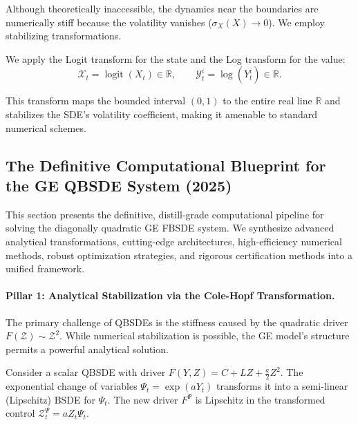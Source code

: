 Although theoretically inaccessible, the dynamics near the boundaries are numerically stiff because the volatility vanishes ($\sigma_X(X) \to 0$). We employ stabilizing transformations.

\begin{lemma}
We apply the Logit transform for the state and the Log transform for the value:
\begin{equation}
    \mathcal{X}_t = \operatorname{logit}(X_t) \in \mathbb{R}, \qquad \mathcal{Y}^i_t = \log(Y^i_t) \in \mathbb{R}.
\end{equation}
\end{lemma}
This transform maps the bounded interval $(0,1)$ to the entire real line $\mathbb{R}$ and stabilizes the SDE's volatility coefficient, making it amenable to standard numerical schemes.

\subsection{The Definitive Computational Blueprint for the GE QBSDE System (2025)}
\label{subsec:GE_discretization_full_R3}

This section presents the definitive, distill-grade computational pipeline for solving the diagonally quadratic GE FBSDE system. We synthesize advanced analytical transformations, cutting-edge architectures, high-efficiency numerical methods, robust optimization strategies, and rigorous certification methods into a unified framework.

\paragraph{Pillar 1: Analytical Stabilization via the Cole-Hopf Transformation.}

The primary challenge of QBSDEs is the stiffness caused by the quadratic driver $F(\mathcal{Z}) \sim \mathcal{Z}^2$. While numerical stabilization is possible, the GE model's structure permits a powerful analytical solution.

\begin{theorem}
Consider a scalar QBSDE with driver $F(Y, Z) = C + LZ + \frac{a}{2} Z^2$. The exponential change of variables $\Psi_t = \exp(a Y_t)$ transforms it into a semi-linear (Lipschitz) BSDE for $\Psi_t$. The new driver $F^\Psi$ is Lipschitz in the transformed control $\mathcal{Z}^\Psi_t = a Z_t \Psi_t$.
\end{theorem}

